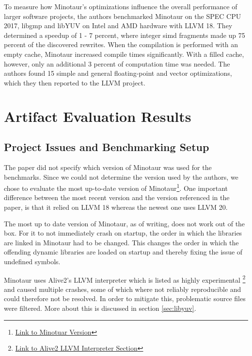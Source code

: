  	To measure how Minotaur's optimizations influence the overall performance of larger software projects, the authors benchmarked Minotaur on the SPEC CPU 2017, libgmp and libYUV on Intel and AMD hardware with LLVM 18.
	They determined a speedup of 1 - 7 percent, where integer \gls*{simd} fragments made up 75 percent of the discovered rewrites.
	When the compilation is performed with an empty cache, Minotaur increased compile times significantly.
	With a filled cache, however, only an additional 3 percent of computation time was needed.
	The authors found 15 simple and general floating-point and vector optimizations, which they then reported to the LLVM project.

 	
 	\section{Artifact Evaluation Results}

	\subsection{Project Issues and Benchmarking Setup}
	The paper did not specify which version of Minotaur was used for the benchmarks.
	Since we could not determine the version used by the authors, we chose to evaluate the most up-to-date version of Minotaur\footnote{\href{https://github.com/KiSchulz/Minotaur/tree/8ae5395286ba40fa29c16a0229fd3d6e9795d4cd}{Link to Minotuar Version}}.
	One important difference between the most recent version and the version referenced in the paper, is that it relied on LLVM 18 whereas the newest one uses LLVM 20.

	The most up to date version of Minotaur, as of writing, does not work out of the box.
	For it to not immediately crash on startup, the order in which the libraries are linked in Minotaur had to be changed.
	This changes the order in which the offending dynamic libraries are loaded on startup and thereby fixing the issue of undefined symbols.

	Minotaur uses Alive2's LLVM interpreter which is listed as highly experimental \footnote{\href{https://github.com/alivetoolkit/alive2/tree/c0f5434f402ad91714ee0952f686cd0f524920ad?tab=readme-ov-file\#running-the-standalone-llvm-execution-tool-alive-exec}{Link to Alive2 LLVM Interpreter Section}} and caused multiple crashes,
	some of which where not reliably reproducible and could therefore not be resolved.
	In order to mitigate this, problematic source files were filtered.
	More about this is discussed in section \ref{sec:libyuv}.

